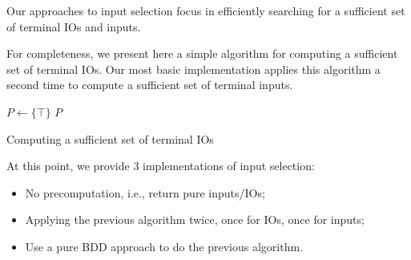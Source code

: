 \documentclass[sigconf,screen,nonacm]{acmart}
\begin{document}
Our approaches to input selection focus in efficiently searching for a
sufficient set of terminal IOs and inputs.



For completeness, we present here a simple algorithm for computing a sufficient
set of terminal IOs.  Our most basic implementation applies this algorithm a
second time to compute a sufficient set of terminal inputs.

\begin{algorithm}

\BlankLine
\(P \leftarrow \{\top\}\)\;
\Return \(P\)
\caption{Computing a sufficient set of terminal IOs}
\end{algorithm}

At this point, we provide 3 implementations of input selection:
\begin{itemize}
\item No precomputation, i.e., return pure inputs/IOs;
\item Applying the previous algorithm twice, once for IOs, once for inputs;
\item Use a pure BDD approach to do the previous algorithm.
\end{itemize}
\end{document}
